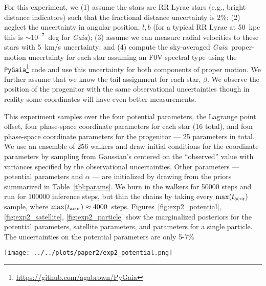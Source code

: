 \documentclass[letterpaper,12pt,preprint]{aastex}
\newcommand{\project}[1]{\textsl{#1}}
\newcommand{\gaia}{\project{Gaia}}
\newcommand{\Loffset}{\alpha}
\begin{document}
For this experiment, we (1) assume the stars are RR Lyrae stars (e.g., bright distance indicators) such that the fractional distance uncertainty is $2\%$; (2) neglect the uncertainty in angular position, $l,b$ (for a typical RR Lyrae at 50~kpc this is $\sim$$10^{-7}$~deg for \gaia); (3) assume we can measure radial velocities to these stars with 5~km/s uncertainty; and (4) compute the sky-averaged \gaia\, proper-motion uncertainty for each star assuming an F0V spectral type using the \texttt{PyGaia}\footnote{\url{https://github.com/agabrown/PyGaia}} code and use this uncertainty for both components of proper motion. We further assume that we know the tail assignment for each star, $\beta$. We observe the position of the progenitor with the same observational uncertainties though in reality some coordinates will have even better measurements.

This experiment samples over the four potential parameters, the Lagrange point offset, four phase-space coordinate parameters for each star (16 total), and four phase-space coordinate parameters for the progenitor --- 25 parameters in total. We use an ensemble of 256 walkers and draw initial conditions for the coordinate parameters by sampling from Gaussian's centered on the ``observed'' value with variances specified by the observational uncertainties. Other parameters --- potential parameters and $\Loffset$ --- are initialized by drawing from the priors summarized in Table~\ref{tbl:params}. We burn in the walkers for 50000 steps and run for 100000 inference steps, but thin the chains by taking every $\max(t_{\rm acor})$ sample, where $\max(t_{\rm acor}) \approx 4000$~steps. Figures~\ref{fig:exp2_potential}, \ref{fig:exp2_satellite}, \ref{fig:exp2_particle} show the marginalized posteriors for the potential parameters, satellite parameters, and parameters for a single particle. The uncertainties on the potential parameters are only 5-7\%

\begin{figure*}[!h]
\begin{center}
\texttt{[image: ../../plots/paper2/exp2\_potential.png]}
\caption{ Projections of the marginal posterior over the triaxial potential parameters for observed stars and progenitor with near-future uncertainties (Section~\ref{sec:exp2}). Axis ranges show the lower and upper bounds on the uniform priors over these parameters. }\label{fig:exp2_potential}
\end{center}
\end{figure*}
\end{document}
